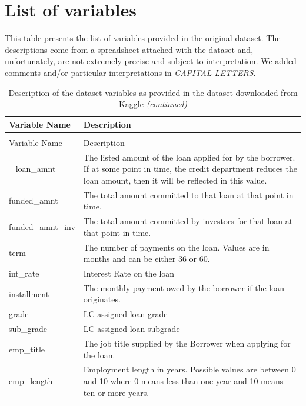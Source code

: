 \documentclass[11pt,]{report}
\begin{document}
\normalsize

\hypertarget{list-of-variables}{%
\section{List of variables}\label{list-of-variables}}

This table presents the list of variables provided in the original dataset. The descriptions come from a spreadsheet attached with the dataset and, unfortunately, are not extremely precise and subject to interpretation. We added comments and/or particular interpretations in \emph{CAPITAL LETTERS}.

\small

\begin{longtable}[t]{>{\raggedright\arraybackslash}p{7cm}>{\raggedright\arraybackslash}p{7cm}}
\caption{\label{tab:variable-description}Description of the dataset variables as provided in the dataset downloaded from Kaggle}\\
\toprule
Variable Name & Description\\
\midrule
\endfirsthead
\caption[]{\label{tab:variable-description}Description of the dataset variables as provided in the dataset downloaded from Kaggle \textit{(continued)}}\\
\toprule
Variable Name & Description\\
\midrule
\endhead
\
\endfoot
\bottomrule
\endlastfoot
loan\_amnt & The listed amount of the loan applied for by the borrower. If at some point in time, the credit department reduces the loan amount, then it will be reflected in this value.\\
funded\_amnt & The total amount committed to that loan at that point in time.\\
funded\_amnt\_inv & The total amount committed by investors for that loan at that point in time.\\
term & The number of payments on the loan. Values are in months and can be either 36 or 60.\\
int\_rate & Interest Rate on the loan\\
\addlinespace
installment & The monthly payment owed by the borrower if the loan originates.\\
grade & LC assigned loan grade\\
sub\_grade & LC assigned loan subgrade\\
emp\_title & The job title supplied by the Borrower when applying for the loan.\\
emp\_length & Employment length in years. Possible values are between 0 and 10 where 0 means less than one year and 10 means ten or more years.\\

\end{longtable}
\end{document}
